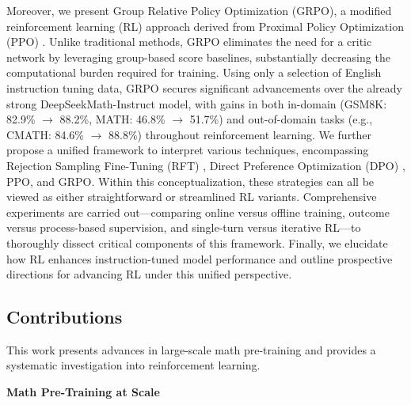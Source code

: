 Moreover, we present Group Relative Policy Optimization (GRPO), a modified reinforcement learning (RL) approach derived from Proximal Policy Optimization (PPO) \citep{schulman2017proximal}. Unlike traditional methods, GRPO eliminates the need for a critic network by leveraging group-based score baselines, substantially decreasing the computational burden required for training. Using only a selection of English instruction tuning data, GRPO secures significant advancements over the already strong DeepSeekMath-Instruct model, with gains in both in-domain (GSM8K: 82.9\% $\rightarrow$ 88.2\%, MATH: 46.8\% $\rightarrow$ 51.7\%) and out-of-domain tasks (e.g., CMATH: 84.6\% $\rightarrow$ 88.8\%) throughout reinforcement learning. We further propose a unified framework to interpret various techniques, encompassing Rejection Sampling Fine-Tuning (RFT) \citep{yuan2023scaling}, Direct Preference Optimization (DPO) \citep{dpo}, PPO, and GRPO. Within this conceptualization, these strategies can all be viewed as either straightforward or streamlined RL variants. Comprehensive experiments are carried out—comparing online versus offline training, outcome versus process-based supervision, and single-turn versus iterative RL—to thoroughly dissect critical components of this framework. Finally, we elucidate how RL enhances instruction-tuned model performance and outline prospective directions for advancing RL under this unified perspective.

\subsection{Contributions}
This work presents advances in large-scale math pre-training and provides a systematic investigation into reinforcement learning.

\textbf{Math Pre-Training at Scale}

